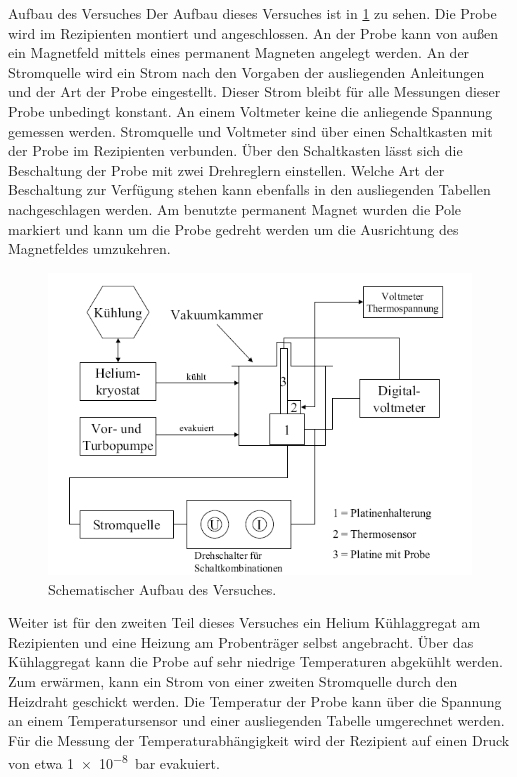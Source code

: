 \documentclass[pdftex, a4paper,11pt, twoside, ngerman]{report}
\begin{document}
  \begin{chapter}{Aufbau des Versuches}
    \label{chp:Aufbau}
    Der Aufbau dieses Versuches ist in \cref{fig:Aufbau} zu sehen.
    Die Probe wird im Rezipienten montiert und angeschlossen.
    An der Probe kann von außen ein Magnetfeld mittels eines permanent Magneten
    angelegt werden. An der Stromquelle wird ein Strom nach den Vorgaben der
    ausliegenden Anleitungen und der Art der Probe eingestellt.
    Dieser Strom bleibt für alle Messungen dieser Probe unbedingt konstant.
    An einem Voltmeter keine die anliegende Spannung gemessen werden.
    Stromquelle und Voltmeter sind über einen Schaltkasten mit der Probe im
    Rezipienten verbunden.
    Über den Schaltkasten lässt sich die Beschaltung der Probe mit zwei
    Drehreglern einstellen.
    Welche Art der Beschaltung zur Verfügung stehen kann ebenfalls in den
    ausliegenden Tabellen nachgeschlagen werden.
    Am benutzte permanent Magnet wurden die Pole markiert und kann um die Probe
    gedreht werden um die Ausrichtung des Magnetfeldes umzukehren.
    
    \begin{figure}[ht!]
      \centering
      \includegraphics[width=\textwidth]{Figures/Aufbau.png}
      \caption{Schematischer Aufbau des Versuches.}
      \label{fig:Aufbau}
    \end{figure}
    
    Weiter ist für den zweiten Teil dieses Versuches ein Helium Kühlaggregat am
    Rezipienten und eine Heizung am Probenträger selbst angebracht.
    Über das Kühlaggregat kann die Probe auf sehr niedrige Temperaturen
    abgekühlt werden. Zum erwärmen, kann ein Strom von einer zweiten Stromquelle
    durch den Heizdraht geschickt werden. Die Temperatur der Probe kann über
    die Spannung an einem Temperatursensor und einer ausliegenden
    Tabelle umgerechnet werden.
    Für die Messung der Temperaturabhängigkeit wird der Rezipient auf einen
    Druck von etwa \SI{1e-8}{\bar} evakuiert.
    

\end{chapter}
\end{document}
